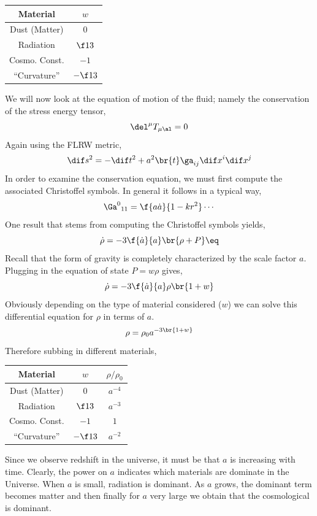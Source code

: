 \documentclass{article}
\begin{document}
\begin{center}
\begin{tabular}{|c|c|}
    \hline
    Material & $w$ \\
    \hline
    Dust (Matter) & $0$ \\
    Radiation & $\f13$ \\
    Cosmo. Const. & $-1$ \\
    ``Curvature'' & $-\f13$ \\
    \hline
\end{tabular}
\end{center}
We will now look at the equation of motion of the fluid; namely the conservation of the stress energy tensor,
\[ \del^\mu T_{\mu\al} = 0 \]
Again using the FLRW metric,
\[ \dif s^2 = - \dif t^2 + a^2 \br{t} \ga_{ij} \dif x^i \dif x^j \]
In order to examine the conservation equation, we must first compute the associated Christoffel symbols. In general it follows in a typical way,
\[ {\Ga^{0}}_{11} = \f{a \dot{a}}{1 - k r^2} \cdots \]
One result that stems from computing the Christoffel symbols yields,
\[ \dot{\rho} = - 3 \f{\dot{a}}{a} \br{\rho + P} \eq \label{eq:densityevolution}\]
Recall that the form of gravity is completely characterized by the scale factor $a$. Plugging in the equation of state $P = w \rho$ gives,
\[ \dot{\rho} = - 3 \f{\dot{a}}{a}\rho \br{1 + w} \]
Obviously depending on the type of material considered ($w$) we can solve this differential equation for $\rho$ in terms of $a$.
\[ \rho = \rho_0 a^{-3 \br{1 + w}} \]
Therefore subbing in different materials,

\begin{center}
\begin{tabular}{|c|c|c|}
    \hline
    Material & $w$ & $\rho/\rho_0$\\
    \hline
    Dust (Matter) & $0$ & $a^{-4}$\\
    Radiation & $\f13$ & $a^{-3}$ \\
    Cosmo. Const. & $-1$ & $1$ \\
    ``Curvature'' & $-\f13$ & $a^{-2}$ \\
    \hline
\end{tabular}
\end{center}

Since we observe redshift in the universe, it must be that $a$ is increasing with time. Clearly, the power on $a$ indicates which materials are dominate in the Universe. When $a$ is small, radiation is dominant. As $a$ grows, the dominant term becomes matter and then finally for $a$ very large we obtain that the cosmological is dominant. \\
\end{document}
